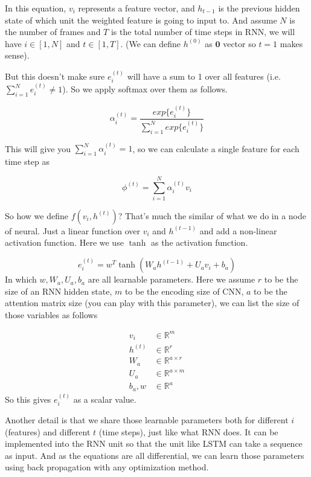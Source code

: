 In this equation, $v_i$ represents a feature vector, and $h_{t-1}$ is the previous hidden state of which unit the weighted feature is going to input to. And assume $N$ is the number of frames and $T$ is the total number of time steps in RNN, we will have $i\in [1,N]$ and $t\in [1,T]$. (We can define $h^{(0)}$ as $\mathbf{0}$ vector so $t=1$ makes sense).

But this doesn't make sure $e_{i}^{(t)}$ will have a sum to 1 over all features (i.e. $\sum_{i=1}^Ne_i^{(t)}\neq 1$). So we apply softmax over them as follows.

\begin{equation}
\alpha_{i}^{(t)} = \frac{exp\{e_{i}^{(t)}\}}{\sum_{i=1}^Nexp\{e_{i}^{(t)}\}}
\end{equation}

This will give you $\sum_{i=1}^N\alpha_{i}^{(t)}=1$, so we can calculate a single feature for each time step as

\begin{equation}
\phi^{(t)}=\sum_{i=1}^N\alpha_{i}^{(t)}v_i
\end{equation}

So how we define $f(v_i,h^{(t)})$? That's much the similar of what we do in a node of neural. Just a linear function over $v_i$ and $h^{(t-1)}$ and add a non-linear activation function. Here we use $\tanh$ as the activation function.

\begin{equation}
e_{i}^{(t)} = w^T\tanh(W_ah^{(t-1)}+U_av_i+b_a)
\end{equation}
In which $w,W_a,U_a,b_a$ are all learnable parameters. Here we assume $r$ to be the size of an RNN hidden state, $m$ to be the encoding size of CNN, $a$ to be the attention matrix size (you can play with this parameter), we can list the size of those variables as follows

\begin{align}
v_i&\in \mathbb{R}^{m} \\
h^{(t)}&\in \mathbb{R}^{r}\\
W_a&\in \mathbb{R}^{a\times r}\\
U_a&\in \mathbb{R}^{a\times m}\\
b_a, w &\in \mathbb{R}^{a}
\end{align}
So this gives $e_i^{(t)}$ as a scalar value.

Another detail is that we share those learnable parameters both for different $i$ (features) and different $t$ (time steps), just like what RNN does. It can be implemented into the RNN unit so that the unit like LSTM can take a sequence as input. And as the equations are all differential, we can learn those parameters using back propagation with any optimization method.

